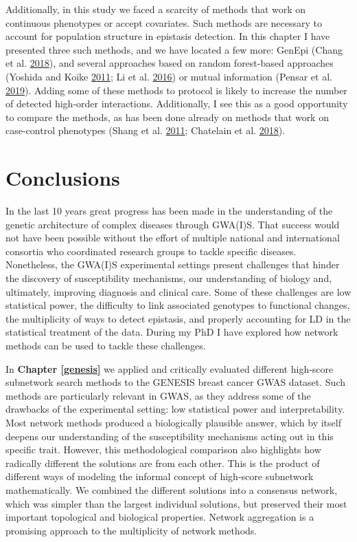 \documentclass[
  11pt,
]{env/yjiao}
\begin{document}
Additionally, in this study we faced a scarcity of methods that work on continuous phenotypes or accept covariates. Such methods are necessary to account for population structure in epistasis detection. In this chapter I have presented three such methods, and we have located a few more: GenEpi (Chang et al. \protect\hyperlink{ref-chang_genepi:_2018}{2018}), and several approaches based on random forest-based approaches (Yoshida and Koike \protect\hyperlink{ref-yoshida_snpinterforest:_2011}{2011}; Li et al. \protect\hyperlink{ref-li_detecting_2016}{2016}) or mutual information (Pensar et al. \protect\hyperlink{ref-pensar_genome-wide_2019}{2019}). Adding some of these methods to protocol is likely to increase the number of detected high-order interactions. Additionally, I see this as a good opportunity to compare the methods, as has been done already on methods that work on case-control phenotypes (Shang et al. \protect\hyperlink{ref-Shang2011}{2011}; Chatelain et al. \protect\hyperlink{ref-chatelain_performance_2018}{2018}).

\hypertarget{conclusions-1}{%
\chapter{Conclusions}\label{conclusions-1}}

In the last 10 years great progress has been made in the understanding of the genetic architecture of complex diseases through GWA(I)S. That success would not have been possible without the effort of multiple national and international consortia who coordinated research groups to tackle specific diseases. Nonetheless, the GWA(I)S experimental settings present challenges that hinder the discovery of susceptibility mechanisms, our understanding of biology and, ultimately, improving diagnosis and clinical care. Some of these challenges are low statistical power, the difficulty to link associated genotypes to functional changes, the multiplicity of ways to detect epistasis, and properly accounting for LD in the statistical treatment of the data. During my PhD I have explored how network methods can be used to tackle these challenges.

In \textbf{Chapter \ref{genesis}} we applied and critically evaluated different high-score subnetwork search methods to the GENESIS breast cancer GWAS dataset. Such methods are particularly relevant in GWAS, as they address some of the drawbacks of the experimental setting: low statistical power and interpretability. Most network methods produced a biologically plausible answer, which by itself deepens our understanding of the susceptibility mechanisms acting out in this specific trait. However, this methodological comparison also highlights how radically different the solutions are from each other. This is the product of different ways of modeling the informal concept of high-score subnetwork mathematically. We combined the different solutions into a consensus network, which was simpler than the largest individual solutions, but preserved their most important topological and biological properties. Network aggregation is a promising approach to the multiplicity of network methods.
\end{document}
